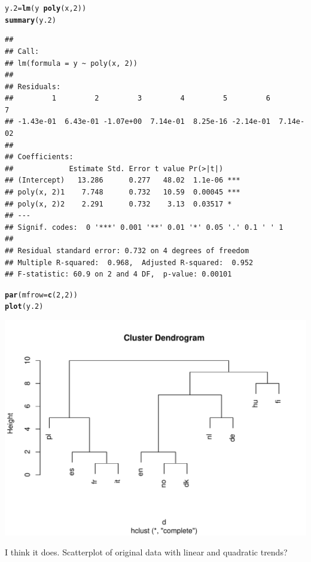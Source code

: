 \documentclass{article}\usepackage[]{graphicx}\usepackage[]{color}
\makeatletter
\def\maxwidth{ %
  \ifdim\Gin@nat@width>\linewidth
    \linewidth
  \else
    \Gin@nat@width
  \fi
}
\newcommand{\hlnum}[1]{\textcolor[rgb]{0.686,0.059,0.569}{#1}}%
\newcommand{\hlopt}[1]{\textcolor[rgb]{0,0,0}{#1}}%
\newcommand{\hlstd}[1]{\textcolor[rgb]{0.345,0.345,0.345}{#1}}%
\newcommand{\hlkwb}[1]{\textcolor[rgb]{0.69,0.353,0.396}{#1}}%
\newcommand{\hlkwc}[1]{\textcolor[rgb]{0.333,0.667,0.333}{#1}}%
\newcommand{\hlkwd}[1]{\textcolor[rgb]{0.737,0.353,0.396}{\textbf{#1}}}%
\newenvironment{kframe}{%
 \def\at@end@of@kframe{}%
 \ifinner\ifhmode%
  \def\at@end@of@kframe{\end{minipage}}%
  \begin{minipage}{\columnwidth}%
 \fi\fi%
 \def\FrameCommand##1{\hskip\@totalleftmargin \hskip-\fboxsep
 \colorbox{shadecolor}{##1}\hskip-\fboxsep
     \hskip-\linewidth \hskip-\@totalleftmargin \hskip\columnwidth}%
 \MakeFramed {\advance\hsize-\width
   \@totalleftmargin\z@ \linewidth\hsize
   \@setminipage}}%
 {\par\unskip\endMakeFramed%
 \at@end@of@kframe}
\newenvironment{knitrout}{}{} %
\makeatother
\begin{document}
\begin{knitrout}
\color{fgcolor}\begin{kframe}
\begin{alltt}
\hlstd{y.2} \hlkwb{=} \hlkwd{lm}\hlstd{(y} \hlopt{~} \hlkwd{poly}\hlstd{(x,} \hlnum{2}\hlstd{))}
\hlkwd{summary}\hlstd{(y.2)}
\end{alltt}
\begin{verbatim}
## 
## Call:
## lm(formula = y ~ poly(x, 2))
## 
## Residuals:
##         1         2         3         4         5         6         7 
## -1.43e-01  6.43e-01 -1.07e+00  7.14e-01  8.25e-16 -2.14e-01  7.14e-02 
## 
## Coefficients:
##             Estimate Std. Error t value Pr(>|t|)    
## (Intercept)   13.286      0.277   48.02  1.1e-06 ***
## poly(x, 2)1    7.748      0.732   10.59  0.00045 ***
## poly(x, 2)2    2.291      0.732    3.13  0.03517 *  
## ---
## Signif. codes:  0 '***' 0.001 '**' 0.01 '*' 0.05 '.' 0.1 ' ' 1
## 
## Residual standard error: 0.732 on 4 degrees of freedom
## Multiple R-squared:  0.968,	Adjusted R-squared:  0.952 
## F-statistic: 60.9 on 2 and 4 DF,  p-value: 0.00101
\end{verbatim}
\begin{alltt}
\hlkwd{par}\hlstd{(}\hlkwc{mfrow} \hlstd{=} \hlkwd{c}\hlstd{(}\hlnum{2}\hlstd{,} \hlnum{2}\hlstd{))}
\hlkwd{plot}\hlstd{(y.2)}
\end{alltt}
\end{kframe}
\includegraphics[width=\maxwidth]{figure/unnamed-chunk-7} 

\end{knitrout}


I think it does. Scatterplot of original data with linear and quadratic trends?
\end{document}
